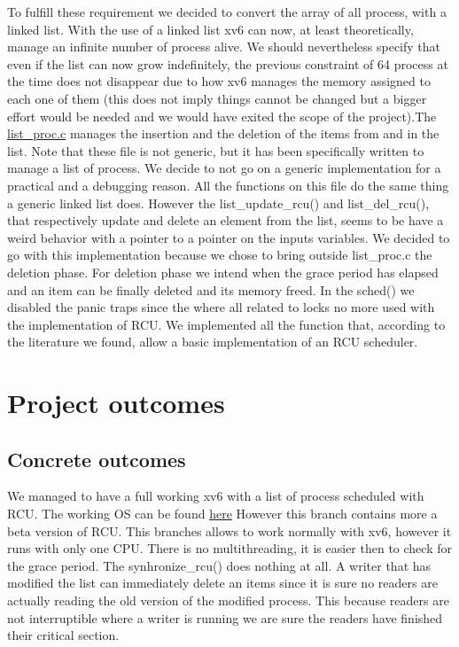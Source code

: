 \documentclass{article}
\begin{document}
To fulfill these requirement we decided to convert the array of all process, with a linked list. With the use of a linked list xv6 can now, at least theoretically,  manage an infinite number of process alive. We should nevertheless specify that even if the list can now grow indefinitely, the previous constraint of 64 process at the time does not disappear due to how xv6 manages the memory  assigned to each one of them (this does not imply things cannot be changed but a bigger effort would be needed and we would have exited the scope of the project).The \href{[inserire hyperlink al codice]}{list\_proc.c}  manages the insertion and the deletion of the items from and in the list. Note that these file is not generic, but it has been specifically written to manage a list of process. We decide to not go on a generic implementation for a practical and a debugging reason.
All the functions on this file do the same thing a generic linked list does. However the list\_update\_rcu() and list\_del\_rcu(), that respectively update and delete an element from the list, seems to be have a weird behavior with a pointer to a pointer on the inputs variables. We decided to go with this implementation because we chose to bring outside list\_proc.c the deletion phase. For deletion phase we intend when the grace period has elapsed and an item can be finally deleted and its memory freed. In the sched() we disabled the panic traps since the where all related to locks no more used with the implementation of RCU. We implemented all the function that, according to the literature we found, allow a basic implementation of an RCU scheduler.


\section{Project outcomes}

\subsection{Concrete outcomes}
We managed to have a full working xv6 with a list of process scheduled with RCU. The working OS can be found \href{inserire.link.parent.handling}{here} However this branch contains more a beta version of RCU. This branches allows to work normally with xv6, however it runs with only one CPU. There is no multithreading, it is easier then to check for the grace period. The synhronize\_rcu() does nothing at all. A writer that has modified the list can immediately delete an items since it is sure no readers are actually reading the old version of the modified process. This because readers are not interruptible where a writer is running we are sure the readers have finished their critical section.
\end{document}
